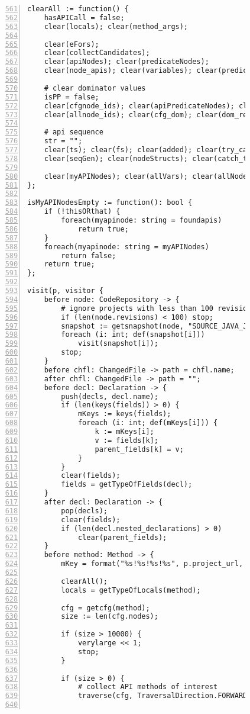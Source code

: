 \begin{figure}[ht!]
\begin{lstlisting}[numbers=left, tabsize=4, escapechar=@, caption={API Usage Mining Analysis},label={lst:aun-code},  firstline = 561, firstnumber = 561, lastline = 621]
clearAll := function() {
    hasAPICall = false;
    clear(locals); clear(method_args);
	    
	clear(eFors);
    clear(collectCandidates);
    clear(apiNodes); clear(predicateNodes); 
    clear(node_apis); clear(variables); clear(predicates);
	    
	# clear dominator values
	isPP = false;
    clear(cfgnode_ids); clear(apiPredicateNodes); clear(exits); clear(exitsT);
    clear(allnode_ids); clear(cfg_dom); clear(dom_result); clear(dom_more); clear(terminals);
	    
    # api sequence
    str = "";
    clear(ts); clear(fs); clear(added); clear(try_catch_finally); clear(catch_counts);
    clear(seqGen); clear(nodeStructs); clear(catch_types);
    
    clear(myAPINodes); clear(allVars); clear(allNodeIds); clear(hops); clear(foundapis);
};

isMyAPINodesEmpty := function(): bool {
    if (!thisORthat) {
        foreach(myapinode: string = foundapis)
            return true;
    }
    foreach(myapinode: string = myAPINodes)    
        return false;
    return true;
};

visit(p, visitor {
	before node: CodeRepository -> {
	    # ignore projects with less than 100 revisions
        if (len(node.revisions) < 100) stop;
		snapshot := getsnapshot(node, "SOURCE_JAVA_JLS");
		foreach (i: int; def(snapshot[i]))
			visit(snapshot[i]);
		stop;
	}
	before chfl: ChangedFile -> path = chfl.name;
	after chfl: ChangedFile -> path = "";
	before decl: Declaration -> {
	    push(decls, decl.name);
	    if (len(keys(fields)) > 0) {
	        mKeys := keys(fields);    
	        foreach (i: int; def(mKeys[i])) {
	        	k := mKeys[i];
	        	v := fields[k];
	            parent_fields[k] = v;
	        }
	    }
	    clear(fields);
	    fields = getTypeOfFields(decl);
	}
    after decl: Declaration -> {
        pop(decls);
        clear(fields);
        if (len(decl.nested_declarations) > 0)
            clear(parent_fields);
    }
	before method: Method -> {
	    mKey = format("%s!%s!%s!%s", p.project_url, path, peek(decls), method.name);
	    
        clearAll();
        locals = getTypeOfLocals(method);

	    cfg = getcfg(method);
	    size := len(cfg.nodes);
	    
	    if (size > 10000) {
		    verylarge << 1;
		    stop;
		}
		
		if (size > 0) {
		    # collect API methods of interest
		    traverse(cfg, TraversalDirection.FORWARD, TraversalKind.SHALLOW_ITERATIVE, collectCandidates);    
            

\end{lstlisting}
\end{figure}
